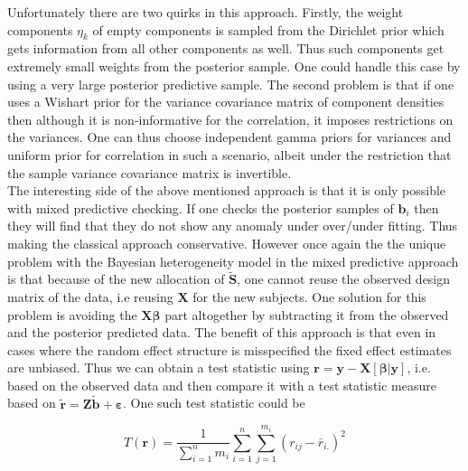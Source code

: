 Unfortunately there are two quirks in this approach. Firstly, the weight components $\eta_k$ of empty components is sampled from the Dirichlet prior which gets information from all other components as well. Thus such components get extremely small weights from the posterior sample. One could handle this case by using a very large posterior predictive sample. The second problem is that if one uses a Wishart prior for the variance covariance matrix of component densities then although it is non-informative for the correlation, it imposes restrictions on the variances. One can thus choose independent gamma priors for variances and uniform prior for correlation in such a scenario, albeit under the restriction that the sample variance covariance matrix is invertible.\\

The interesting side of the above mentioned approach is that it is only possible with mixed predictive checking. If one checks the posterior samples of $\boldsymbol{b}_i$ then they will find that they do not show any anomaly under over/under fitting. Thus making the classical approach conservative. However once again the the unique problem with the Bayesian heterogeneity model in the mixed predictive approach is that because of the new allocation of $\boldsymbol{\tilde{S}}$, one cannot reuse the observed design matrix of the data, i.e reusing $\boldsymbol{X}$ for the new subjects. One solution for this problem is avoiding the $\boldsymbol{X\beta}$ part altogether by subtracting it from the observed and the posterior predicted data. The benefit of this approach is that even in cases where the random effect structure is misspecified the fixed effect estimates are unbiased. Thus we can obtain a test statistic using $\boldsymbol{r} = \boldsymbol{y} - \boldsymbol{X}[\boldsymbol{\beta}|\boldsymbol{y}]$, i.e. based on the observed data and then compare it with a test statistic measure based on $\boldsymbol{\tilde{r}}=\boldsymbol{Z\tilde{b}} + \boldsymbol{\varepsilon}$. One such test statistic could be

\begin{equation}
\label{eq : ppc_test_statistic}
T(\boldsymbol{r}) = \frac 1 {\sum_{i=1}^n m_i} \sum_{i=1}^n \sum_{j=1}^{m_i} {(r_{ij}-\bar{r}_{i.})}^2
\end{equation}

